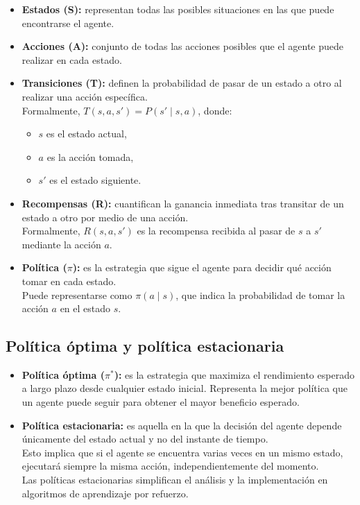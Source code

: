 \begin{itemize}
    \item \textbf{Estados (S):} representan todas las posibles situaciones en las que puede encontrarse el agente.
    
    \item \textbf{Acciones (A):} conjunto de todas las acciones posibles que el agente puede realizar en cada estado.
    
    \item \textbf{Transiciones (T):} definen la probabilidad de pasar de un estado a otro al realizar una acción específica. \\
    Formalmente, $T(s, a, s') = P(s' \mid s, a)$, donde:
    \begin{itemize}
        \item $s$ es el estado actual,
        \item $a$ es la acción tomada,
        \item $s'$ es el estado siguiente.
    \end{itemize}
    
    \item \textbf{Recompensas (R):} cuantifican la ganancia inmediata tras transitar de un estado a otro por medio de una acción. \\
    Formalmente, $R(s, a, s')$ es la recompensa recibida al pasar de $s$ a $s'$ mediante la acción $a$.
    
    \item \textbf{Política ($\pi$):} es la estrategia que sigue el agente para decidir qué acción tomar en cada estado. \\
    Puede representarse como $\pi(a \mid s)$, que indica la probabilidad de tomar la acción $a$ en el estado $s$.
\end{itemize}

\subsection*{Política óptima y política estacionaria}

\begin{itemize}
    \item \textbf{Política óptima ($\pi^*$):} es la estrategia que maximiza el rendimiento esperado a largo plazo desde cualquier estado inicial. Representa la mejor política que un agente puede seguir para obtener el mayor beneficio esperado.

    \item \textbf{Política estacionaria:} es aquella en la que la decisión del agente depende únicamente del estado actual y no del instante de tiempo. \\
    Esto implica que si el agente se encuentra varias veces en un mismo estado, ejecutará siempre la misma acción, independientemente del momento. \\
    Las políticas estacionarias simplifican el análisis y la implementación en algoritmos de aprendizaje por refuerzo.
\end{itemize}

